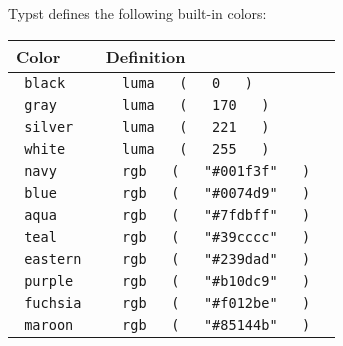 Typst defines the following built-in colors:

\begin{longtable}[]{@{}ll@{}}
\toprule\noalign{}
Color & Definition \\
\midrule\noalign{}
\endhead
\bottomrule\noalign{}
\endlastfoot
\texttt{\ black\ } &
\texttt{\ }{\texttt{\ luma\ }}\texttt{\ }{\texttt{\ (\ }}\texttt{\ }{\texttt{\ 0\ }}\texttt{\ }{\texttt{\ )\ }}\texttt{\ } \\
\texttt{\ gray\ } &
\texttt{\ }{\texttt{\ luma\ }}\texttt{\ }{\texttt{\ (\ }}\texttt{\ }{\texttt{\ 170\ }}\texttt{\ }{\texttt{\ )\ }}\texttt{\ } \\
\texttt{\ silver\ } &
\texttt{\ }{\texttt{\ luma\ }}\texttt{\ }{\texttt{\ (\ }}\texttt{\ }{\texttt{\ 221\ }}\texttt{\ }{\texttt{\ )\ }}\texttt{\ } \\
\texttt{\ white\ } &
\texttt{\ }{\texttt{\ luma\ }}\texttt{\ }{\texttt{\ (\ }}\texttt{\ }{\texttt{\ 255\ }}\texttt{\ }{\texttt{\ )\ }}\texttt{\ } \\
\texttt{\ navy\ } &
\texttt{\ }{\texttt{\ rgb\ }}\texttt{\ }{\texttt{\ (\ }}\texttt{\ }{\texttt{\ "\#001f3f"\ }}\texttt{\ }{\texttt{\ )\ }}\texttt{\ } \\
\texttt{\ blue\ } &
\texttt{\ }{\texttt{\ rgb\ }}\texttt{\ }{\texttt{\ (\ }}\texttt{\ }{\texttt{\ "\#0074d9"\ }}\texttt{\ }{\texttt{\ )\ }}\texttt{\ } \\
\texttt{\ aqua\ } &
\texttt{\ }{\texttt{\ rgb\ }}\texttt{\ }{\texttt{\ (\ }}\texttt{\ }{\texttt{\ "\#7fdbff"\ }}\texttt{\ }{\texttt{\ )\ }}\texttt{\ } \\
\texttt{\ teal\ } &
\texttt{\ }{\texttt{\ rgb\ }}\texttt{\ }{\texttt{\ (\ }}\texttt{\ }{\texttt{\ "\#39cccc"\ }}\texttt{\ }{\texttt{\ )\ }}\texttt{\ } \\
\texttt{\ eastern\ } &
\texttt{\ }{\texttt{\ rgb\ }}\texttt{\ }{\texttt{\ (\ }}\texttt{\ }{\texttt{\ "\#239dad"\ }}\texttt{\ }{\texttt{\ )\ }}\texttt{\ } \\
\texttt{\ purple\ } &
\texttt{\ }{\texttt{\ rgb\ }}\texttt{\ }{\texttt{\ (\ }}\texttt{\ }{\texttt{\ "\#b10dc9"\ }}\texttt{\ }{\texttt{\ )\ }}\texttt{\ } \\
\texttt{\ fuchsia\ } &
\texttt{\ }{\texttt{\ rgb\ }}\texttt{\ }{\texttt{\ (\ }}\texttt{\ }{\texttt{\ "\#f012be"\ }}\texttt{\ }{\texttt{\ )\ }}\texttt{\ } \\
\texttt{\ maroon\ } &
\texttt{\ }{\texttt{\ rgb\ }}\texttt{\ }{\texttt{\ (\ }}\texttt{\ }{\texttt{\ "\#85144b"\ }}\texttt{\ }{\texttt{\ )\ }}\texttt{\ } \\

\end{longtable}
